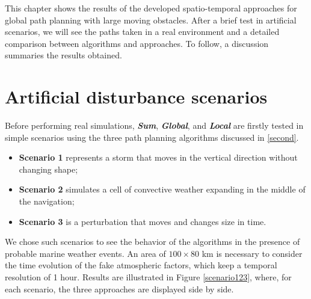 \label{results}
This chapter shows the results of the developed spatio-temporal approaches for global path planning with large moving obstacles. After a brief test in artificial scenarios, we will see the paths taken in a real environment and a detailed comparison between algorithms and approaches. To follow, a discussion summaries the results obtained.
\section{Artificial disturbance scenarios}
Before performing real simulations, \textbf{\textit{Sum}}, \textbf{\textit{Global}}, and \textbf{\textit{Local}} are firstly tested in simple scenarios using the three path planning algorithms discussed in \autoref{second}.
\begin{itemize}[itemsep=0pt]
	\item \textbf{Scenario 1} represents a storm that moves in the vertical direction without changing shape;
	\item \textbf{Scenario 2} simulates a cell of convective weather expanding in the middle of the navigation; %
	\item \textbf{Scenario 3} is a perturbation that moves and changes size in time.
\end{itemize}
We chose such scenarios to see the behavior of the algorithms in the presence of probable marine weather events.
An area of $100\times80$ km is necessary to consider the time evolution of the fake atmospheric factors, which keep a temporal resolution of 1 hour. Results are illustrated in Figure \ref{scenario123}, where, for each scenario, the three approaches are displayed side by side.


